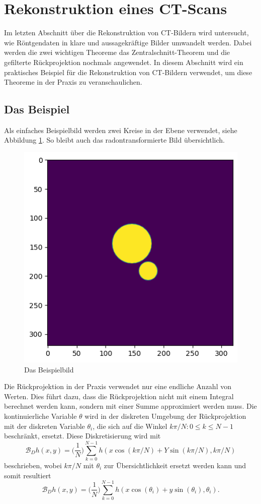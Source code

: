 %
%
%
%
\section{Rekonstruktion eines CT-Scans
\label{ct:section:rekonstruktion}}
Im letzten Abschnitt über die Rekonstruktion von CT-Bildern wird untersucht, wie Röntgendaten in klare und aussagekräftige Bilder umwandelt werden. Dabei werden die zwei wichtigen Theoreme das Zentralschnitt-Theorem und die gefilterte Rückprojektion nochmals angewendet. In diesem Abschnitt wird ein praktisches Beispiel für die Rekonstruktion von CT-Bildern verwendet, um diese Theoreme in der Praxis zu veranschaulichen. 

\subsection{Das Beispiel
\label{ct:subsection:malorum}}
Als einfaches Beispielbild werden zwei Kreise in der Ebene verwendet, siehe Abbildung \ref{ct:img_example}. So bleibt auch das radontransformierte Bild übersichtlich.

\begin{figure}
	\centering
	\includegraphics[width=0.5\linewidth]{papers/ct/images/img_recon.png}
	\caption{Das Beispielbild
		\label{ct:img_example}}
\end{figure}

Die Rückprojektion in der Praxis verwendet nur eine endliche Anzahl von Werten. Dies führt dazu, dass die Rückprojektion nicht mit einem Integral berechnet werden kann, sondern mit einer Summe approximiert werden muss. 
Die kontinuierliche Variable $\theta$ wird in der diskreten Umgebung der Rückprojektion mit der diskreten Variable $\theta_i$, die sich auf die Winkel ${k\pi/N: 0\le k \le N-1}$ beschränkt, ersetzt. Diese Diskretisierung wird mit 
\begin{equation}\label{ct:discreteBP}
		\mathscr{B}_Dh(x, y) = \big(\dfrac{1}{N}\big)\sum_{k=0}^{N-1} h(x\cos(k\pi/N)+Y\sin(k\pi/N), k\pi/N)
\end{equation}
beschrieben, wobei $k\pi/N$ mit $\theta_i$ zur Übersichtlichkeit ersetzt werden kann und somit resultiert
\begin{equation}\label{ct:discreteBP}
	\mathscr{B}_Dh(x, y) = \big(\dfrac{1}{N}\big)\sum_{k=0}^{N-1} h(x\cos(\theta_i)+y\sin(\theta_i), \theta_i).
\end{equation}

